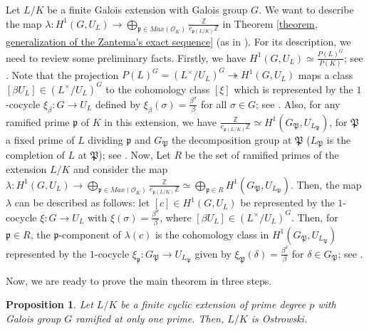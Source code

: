 \documentclass{amsart}
\newtheorem{proposition}[theorem]{Proposition}
\theoremstyle{definition}
\numberwithin{equation}{section}
\begin{document}
Let $L/K$ be a finite Galois extension with Galois group $G$. We want to describe the map $\lambda: H^1(G,U_L) \rightarrow \bigoplus_{\mathfrak{p} \in Max(\mathcal{O}_K)} \frac{\mathbb{Z}}{e_{\mathfrak{p}(L/K)}\mathbb{Z}}$ in Theorem \ref{theorem, generalization of the Zantema's exact sequence} (as in \cite[p.80]{Aviles}). For 
its description, we need to review some preliminary facts. Firstly, we have $H^1(G,U_L) \simeq \frac{P(L)^G}{P(K)}$; see \cite[p.370]{MR2}. Note that the projection $P(L)^G=(L^\times/U_L)^G \twoheadrightarrow H^1(G,U_L)$ 
maps a class $[\beta U_L] \in (L^\times/U_L)^G$ to the cohomology class $[\xi]$ which is represented by the $1$-cocycle $\xi_{\beta}:G \rightarrow U_L$ defined by $\xi_{\beta}(\sigma)=\frac{\beta^{\sigma}}{\beta}$ for all $\sigma \in G$; see \cite[p.78]{Aviles}.
 Also, for any ramified prime $\mathfrak{p}$ of $K$ in this extension, we have $\frac{\mathbb{Z}}{e_{\mathfrak{p}(L/K)}\mathbb{Z}} \simeq H^1(G_{\mathfrak{P}}, U_{L_{\mathfrak{P}}})$, for $\mathfrak{P}$ a fixed prime of $L$ dividing $\mathfrak{p}$ and $G_{\mathfrak{P}}$ the decomposition group at $\mathfrak{P}$ ($L_{\mathfrak{P}}$ is 
 the completion of $L$ at $\mathfrak{P}$); see \cite[Proof of Lemma 2.3]{Aviles}. Now, Let $R$ be the set of ramified primes of the extension $L/K$ and consider the map $\lambda: H^1(G,U_L) \rightarrow \bigoplus_{\mathfrak{p} \in Max(\mathcal{O}_K)} \frac{\mathbb{Z}}{e_{\mathfrak{p}(L/K)}\mathbb{Z}} \simeq \bigoplus_{\mathfrak{p} \in R} H^1(G_{\mathfrak{P}}, U_{L_{\mathfrak{P}}})$. Then, 
 the map $\lambda$ can be described as follows: let $[c] \in H^1(G,U_L)$ be represented by the $1$-cocycle $\xi:G \rightarrow U_L$ with $\xi(\sigma)=\frac{\beta^{\sigma}}{\beta}$, where $[\beta U_L] \in (L^\times/U_L)^G$. Then, for $\mathfrak{p} \in R$, the $\mathfrak{p}$-component of $\lambda(c)$ is the cohomology class in $H^1(G_{\mathfrak{P}}, U_{L_{\mathfrak{P}}})$ represented by 
 the $1$-cocycle $\xi_{\mathfrak{p}}:G_{\mathfrak{P}} \rightarrow U_{L_{\mathfrak{P}}}$ given by $\xi_{\mathfrak{P}}(\delta)=\frac{\beta^{\delta}}{\beta}$ for $\delta \in G_{\mathfrak{P}}$; see \cite[p.80]{Aviles}.

Now, we are ready to prove the main theorem in three steps.

\begin{proposition} \label{proposition, cyclic of prime degree case}
Let $L/K$ be a finite cyclic extension of prime degree $p$ with Galois group $G$ ramified at only one prime. Then, $L/K$ is Ostrowski.
\end{proposition}
\end{document}
